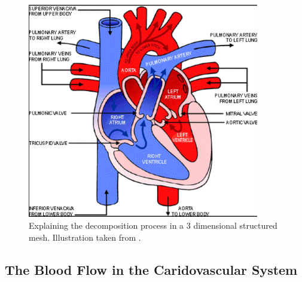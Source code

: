 \begin{figure}[h]
 \centering 
     \includegraphics[width=0.9\textwidth]{bilder/b_heart_structure_new}
     \caption{Explaining the decomposition process in a 3 dimensional structured mesh. Illustration taken from \cite{article9}.
     \label{b_heart_structure_new.png}}
\end{figure}


\subsection{The Blood Flow in the Caridovascular System}


